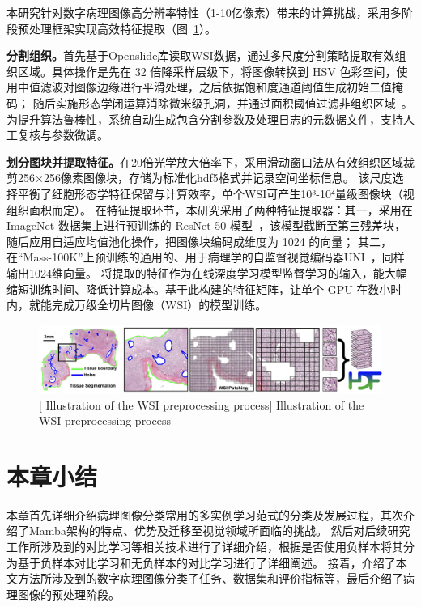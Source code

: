 本研究针对数字病理图像高分辨率特性（1-10亿像素）带来的计算挑战，采用多阶段预处理框架实现高效特征提取（图~\ref{figure1: 数字病理图像的预处理过程示意图}）。

\textbf{分割组织。}首先基于Openslide库读取WSI数据，通过多尺度分割策略提取有效组织区域。具体操作是先在 32 倍降采样层级下，将图像转换到 HSV 色彩空间，使用中值滤波对图像边缘进行平滑处理，之后依据饱和度通道阈值生成初始二值掩码；
随后实施形态学闭运算消除微米级孔洞，并通过面积阈值过滤非组织区域~\cite{lu2021data}。
为提升算法鲁棒性，系统自动生成包含分割参数及处理日志的元数据文件，支持人工复核与参数微调。

\textbf{划分图块并提取特征。}在20倍光学放大倍率下，采用滑动窗口法从有效组织区域裁剪256×256像素图像块，存储为标准化hdf5格式并记录空间坐标信息。
该尺度选择平衡了细胞形态学特征保留与计算效率，单个WSI可产生10³-10⁴量级图像块（视组织面积而定）。
在特征提取环节，本研究采用了两种特征提取器：其一，采用在 ImageNet 数据集上进行预训练的 ResNet-50 模型~\cite{he2016deep}，该模型截断至第三残差块，随后应用自适应均值池化操作，把图像块编码成维度为 1024 的向量；
其二， 在“Mass-100K”上预训练的通用的、用于病理学的自监督视觉编码器UNI~\cite{chen2024towards}，同样输出1024维向量。
将提取的特征作为在线深度学习模型监督学习的输入，能大幅缩短训练时间、降低计算成本。基于此构建的特征矩阵，让单个 GPU 在数小时内，就能完成万级全切片图像（WSI）的模型训练。

\begin{figure}[h]
    \centering
    \includegraphics[width=1.0\columnwidth]{figures/RelatedWork/CLAM1.jpg}
    [ Illustration of the WSI preprocessing process]{ Illustration of the WSI preprocessing process~\cite{lu2021data}}
    \label{figure1: 数字病理图像的预处理过程示意图}
\end{figure}
\section[\hspace{-2pt}本章小结]{{\heiti{} \hspace{-8pt}本章小结}}\label{section2: 本章小结}

本章首先详细介绍病理图像分类常用的多实例学习范式的分类及发展过程，其次介绍了Mamba架构的特点、优势及迁移至视觉领域所面临的挑战。
然后对后续研究工作所涉及到的对比学习等相关技术进行了详细介绍，根据是否使用负样本将其分为基于负样本对比学习和无负样本的对比学习进行了详细阐述。
接着，介绍了本文方法所涉及到的数字病理图像分类子任务、数据集和评价指标等，最后介绍了病理图像的预处理阶段。
